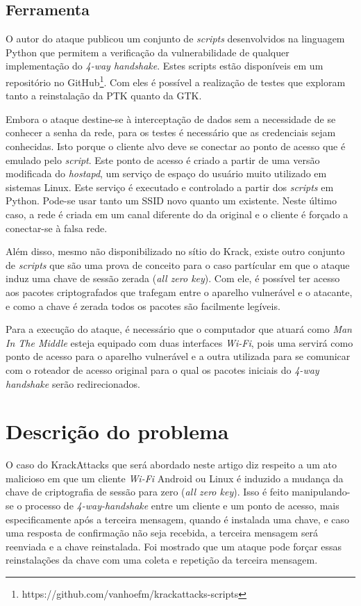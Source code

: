 \documentclass[12pt]{article}
\begin{document}
\subsection{Ferramenta}
O autor do ataque publicou um conjunto de \textit{scripts} desenvolvidos na linguagem Python que permitem a verificação da vulnerabilidade de qualquer implementação do \textit{4-way handshake}. Estes scripts estão disponíveis em um repositório no GitHub\footnote{https://github.com/vanhoefm/krackattacks-scripts}. Com eles é possível a realização de testes que exploram tanto a reinstalação da PTK quanto da GTK.

Embora o ataque destine-se à interceptação de dados sem a necessidade de se conhecer a senha da rede, para os testes é necessário que as credenciais sejam conhecidas. Isto porque o cliente alvo deve se conectar ao ponto de acesso que é emulado pelo \textit{script}. Este ponto de acesso é criado a partir de uma versão modificada do \textit{hostapd}, um serviço de espaço do usuário muito utilizado em sistemas Linux. Este serviço é executado e controlado a partir dos \textit{scripts} em Python. Pode-se usar tanto um SSID novo quanto um existente. Neste último caso, a rede é criada em um canal diferente do da original e o cliente é forçado a conectar-se à falsa rede.

Além disso, mesmo não disponibilizado no sítio do Krack, existe outro conjunto de \textit{scripts} que são uma prova de conceito para o caso partícular em que o ataque induz uma chave de sessão zerada (\textit{all zero key}). Com ele, é possível ter acesso aos pacotes criptografados que trafegam entre o aparelho vulnerável e o atacante, e como a chave é zerada todos os pacotes são facilmente legíveis.

Para a execução do ataque, é necessário que o computador que atuará como \textit{Man In The Middle} esteja equipado com duas interfaces \textit{Wi-Fi}, pois uma servirá como ponto de acesso para o aparelho vulnerável e a outra utilizada para se comunicar com o roteador de acesso original para o qual os pacotes iniciais do \textit{4-way handshake} serão redirecionados.


\section{Descrição do problema}
O caso do KrackAttacks que será abordado neste artigo diz respeito a um ato malicioso em que um cliente \textit{Wi-Fi} Android ou Linux é induzido a mudança da chave de criptografia de sessão para zero (\textit{all zero key}). Isso é feito manipulando-se o processo de \textit{4-way-handshake} entre um cliente e um ponto de acesso, mais especificamente após a terceira mensagem, quando é instalada uma chave, e caso uma resposta de confirmação não seja recebida, a terceira mensagem será reenviada e a chave reinstalada. Foi mostrado que um ataque pode forçar essas reinstalações da chave com uma coleta e repetição da terceira mensagem. 
\end{document}
